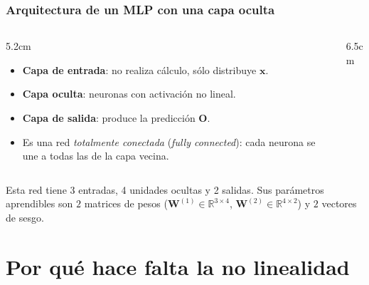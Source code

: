 \documentclass[aspectratio=169, 10pt]{beamer}
\newcommand{\R}{\mathbb{R}}
\newcommand{\h}{\bm{h}}
\newcommand{\x}{\bm{x}}
\newcommand{\W}{\bm{W}}
\newcommand{\Ob}{\bm{O}}
\begin{document}
\begin{frame}
\frametitle{Arquitectura de un MLP con una capa oculta}
\begin{columns}[T]
\begin{column}{5.2cm}
\begin{itemize}
	\item \textbf{Capa de entrada}: no realiza c\'alculo, s\'olo distribuye $\x$.
	\item \textbf{Capa oculta}: neuronas con activaci\'on no lineal.
	\item \textbf{Capa de salida}: produce la predicci\'on $\Ob$.
	\item Es una red \emph{totalmente conectada} (\emph{fully connected}): cada neurona se une a todas las de la capa vecina.
\end{itemize}
\end{column}
\begin{column}{6.5cm}
\begin{center}
\end{center}
\end{column}
\end{columns}
\vspace{0.3em}
\footnotesize Esta red tiene 3 entradas, 4 unidades ocultas y 2 salidas. Sus par\'ametros aprendibles son $2$ matrices de pesos ($\W^{(1)}\in\R^{3\times4}$, $\W^{(2)}\in\R^{4\times2}$) y $2$ vectores de sesgo.
\end{frame}

\section{Por qu\'e hace falta la no linealidad}
\end{document}
